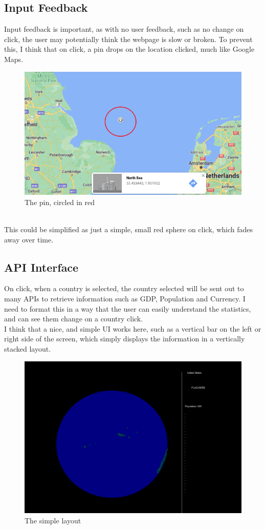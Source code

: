 \subsection{Input Feedback}
Input feedback is important, as with no user feedback, such as no change on click, the user may potentially think the webpage is slow or broken. To prevent this, I think that on click, a pin drops on the location clicked, much like Google Maps.
\begin{figure}[h]
\centering
\includegraphics[width=0.9\linewidth]{images/circled}
\caption{The pin, circled in red}
\label{fig:circled}
\end{figure}
\\ This could be simplified as just a simple, small red sphere on click, which fades away over time.

\newpage

\subsection{API Interface}
On click, when a country is selected, the country selected will be sent out to many APIs to retrieve information such as GDP, Population and Currency. I need to format this in a way that the user can easily understand the statistics, and can see them change on a country click. \\
I think that a nice, and simple UI works here, such as a vertical bar on the left or right side of the screen, which simply displays the information in a vertically stacked layout. \\
\begin{figure}[h]
\centering
\includegraphics[width=0.9\linewidth]{images/layout}
\caption{The simple layout}
\label{fig:layout}
\end{figure}

